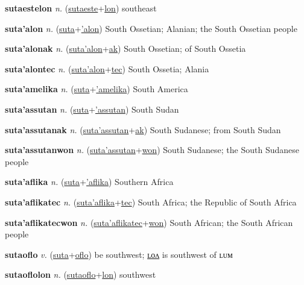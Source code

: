 \textbf{\hypertarget{sutaestelon}{sutaestelon}} \textit{n.} (\hyperlink{sutaeste}{sutaeste}+\allowbreak \hyperlink{lon}{lon})
southeast

\textbf{\hypertarget{suta'alon}{suta'alon}} \textit{n.} (\hyperlink{suta}{suta}+\allowbreak \hyperlink{'alon}{'alon})
South Ossetian; Alanian; the South Ossetian people

\textbf{\hypertarget{suta'alonak}{suta'alonak}} \textit{n.} (\hyperlink{suta'alon}{suta'alon}+\allowbreak \hyperlink{ak}{ak})
South Ossetian; of South Ossetia

\textbf{\hypertarget{suta'alontec}{suta'alontec}} \textit{n.} (\hyperlink{suta'alon}{suta'alon}+\allowbreak \hyperlink{tec}{tec})
South Ossetia; Alania

\textbf{\hypertarget{suta'amelika}{suta'amelika}} \textit{n.} (\hyperlink{suta}{suta}+\allowbreak \hyperlink{'amelika}{'amelika})
South America

\textbf{\hypertarget{suta'assutan}{suta'assutan}} \textit{n.} (\hyperlink{suta}{suta}+\allowbreak \hyperlink{'assutan}{'assutan})
South Sudan

\textbf{\hypertarget{suta'assutanak}{suta'assutanak}} \textit{n.} (\hyperlink{suta'assutan}{suta'assutan}+\allowbreak \hyperlink{ak}{ak})
South Sudanese; from South Sudan

\textbf{\hypertarget{suta'assutanwon}{suta'assutanwon}} \textit{n.} (\hyperlink{suta'assutan}{suta'assutan}+\allowbreak \hyperlink{won}{won})
South Sudanese; the South Sudanese people

\textbf{\hypertarget{suta'aflika}{suta'aflika}} \textit{n.} (\hyperlink{suta}{suta}+\allowbreak \hyperlink{'aflika}{'aflika})
Southern Africa

\textbf{\hypertarget{suta'aflikatec}{suta'aflikatec}} \textit{n.} (\hyperlink{suta'aflika}{suta'aflika}+\allowbreak \hyperlink{tec}{tec})
South Africa; the Republic of South Africa

\textbf{\hypertarget{suta'aflikatecwon}{suta'aflikatecwon}} \textit{n.} (\hyperlink{suta'aflikatec}{suta'aflikatec}+\allowbreak \hyperlink{won}{won})
South African; the South African people

\textbf{\hypertarget{sutaoflo}{sutaoflo}} \textit{v.} (\hyperlink{suta}{suta}+\allowbreak \hyperlink{oflo}{oflo})
be southwest; \hyperlink{sutaoflolon}{ʟᴏᴧ} is southwest of ʟᴜᴍ

\textbf{\hypertarget{sutaoflolon}{sutaoflolon}} \textit{n.} (\hyperlink{sutaoflo}{sutaoflo}+\allowbreak \hyperlink{lon}{lon})
southwest

